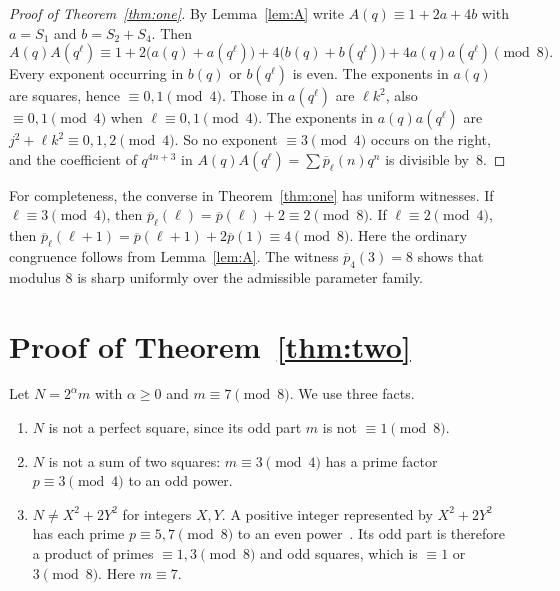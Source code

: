 \documentclass[11pt]{article}
\theoremstyle{remark}\newtheorem{remark}[theorem]{Remark}
\newcommand{\pb}{\overline{p}}
\begin{document}
\begin{proof}[Proof of Theorem~\ref{thm:one}]
By Lemma~\ref{lem:A} write $A(q)\equiv1+2a+4b$ with $a=S_1$ and $b=S_2+S_4$. Then
\[A(q)A(q^\ell)\equiv1+2\bigl(a(q)+a(q^\ell)\bigr)+4\bigl(b(q)+b(q^\ell)\bigr)+4a(q)a(q^\ell)\pmod8.\]
Every exponent occurring in $b(q)$ or $b(q^\ell)$ is even. The exponents in $a(q)$ are squares, hence $\equiv0,1\pmod4$. Those in $a(q^\ell)$ are $\ell k^2$, also $\equiv0,1\pmod4$ when $\ell\equiv0,1\pmod 4$. The exponents in $a(q)a(q^\ell)$ are $j^2+\ell k^2\equiv0,1,2\pmod 4$. So no exponent $\equiv3\pmod4$ occurs on the right, and the coefficient of $q^{4n+3}$ in $A(q)A(q^\ell)=\sum\pb_\ell(n)q^n$ is divisible by~$8$.
\end{proof}

For completeness, the converse in Theorem~\ref{thm:one} has uniform witnesses. If $\ell\equiv3\pmod4$, then $\pb_\ell(\ell)=\pb(\ell)+2\equiv2\pmod8$. If $\ell\equiv2\pmod4$, then $\pb_\ell(\ell+1)=\pb(\ell+1)+2\pb(1)\equiv4\pmod8$. Here the ordinary congruence follows from Lemma~\ref{lem:A}. The witness $\pb_4(3)=8$ shows that modulus $8$ is sharp uniformly over the admissible parameter family.
\section{Proof of Theorem~\ref{thm:two}}

Let $N=2^\alpha m$ with $\alpha\ge0$ and $m\equiv7\pmod8$. We use three facts.
\begin{enumerate}
\item[(F1)] $N$ is not a perfect square, since its odd part $m$ is not $\equiv1\pmod 8$.
\item[(F2)] $N$ is not a sum of two squares: $m\equiv3\pmod4$ has a prime factor $p\equiv3\pmod4$ to an odd power.
\item[(F3)] $N\ne X^2+2Y^2$ for integers $X,Y$. A positive integer represented by $X^2+2Y^2$ has each prime $p\equiv5,7\pmod8$ to an even power~\cite[Ch.~1]{Cox}. Its odd part is therefore a product of primes $\equiv1,3\pmod8$ and odd squares, which is $\equiv1$ or $3\pmod 8$. Here $m\equiv7$.
\end{enumerate}
\end{document}
